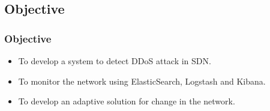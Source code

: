 \documentclass[10pt]{beamer}
\begin{document}

\begin{frame}
\section[]{Objective}
\frametitle{Objective}
\begin{center}
\begin{itemize}
\footnotesize
\item
To develop a system to detect DDoS attack in SDN.
\item
To monitor the network using ElasticSearch, Logstash and Kibana.
\item
To develop an adaptive solution for change in the  network.
\end{itemize}
\end{center}
\end{frame}
\end{document}
